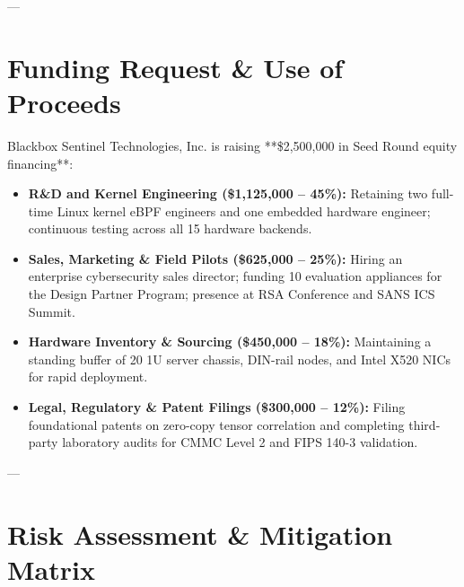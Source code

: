 \documentclass[11pt,a4paper]{article}
\begin{document}
---

\section{Funding Request \& Use of Proceeds}

Blackbox Sentinel Technologies, Inc. is raising **\$2,500,000 in Seed Round equity financing**:
\begin{itemize}
    \item \textbf{R\&D and Kernel Engineering (\$1,125,000 -- 45\%):} Retaining two full-time Linux kernel eBPF engineers and one embedded hardware engineer; continuous testing across all 15 hardware backends.
    \item \textbf{Sales, Marketing \& Field Pilots (\$625,000 -- 25\%):} Hiring an enterprise cybersecurity sales director; funding 10 evaluation appliances for the Design Partner Program; presence at RSA Conference and SANS ICS Summit.
    \item \textbf{Hardware Inventory \& Sourcing (\$450,000 -- 18\%):} Maintaining a standing buffer of 20 1U server chassis, DIN-rail nodes, and Intel X520 NICs for rapid deployment.
    \item \textbf{Legal, Regulatory \& Patent Filings (\$300,000 -- 12\%):} Filing foundational patents on zero-copy tensor correlation and completing third-party laboratory audits for CMMC Level 2 and FIPS 140-3 validation.
\end{itemize}

---

\section{Risk Assessment \& Mitigation Matrix}
\end{document}
